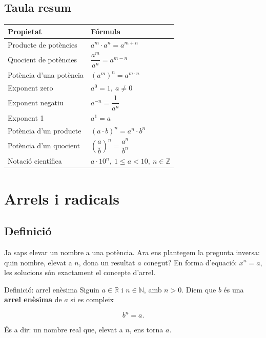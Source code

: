 \subsection{Taula resum}

\begin{center}
\begin{tabular}{ll}
\toprule
\textbf{Propietat} & \textbf{Fórmula} \\
\midrule
Producte de potències & $a^m \cdot a^n = a^{m+n}$ \\
Quocient de potències & $\dfrac{a^m}{a^n} = a^{m-n}$ \\
Potència d'una potència & $(a^m)^n = a^{m\cdot n}$ \\
Exponent zero & $a^0 = 1,\ a\neq 0$ \\
Exponent negatiu & $a^{-n} = \dfrac{1}{a^n}$ \\
Exponent 1 & $a^1 = a$ \\
Potència d'un producte & $(a\cdot b)^n = a^n\cdot b^n$ \\
Potència d'un quocient & $\left(\dfrac{a}{b}\right)^n = \dfrac{a^n}{b^n}$ \\
Notació científica & $a\cdot 10^n,\ 1\le a<10,\ n\in\mathbb{Z}$ \\
\bottomrule
\end{tabular}
\end{center}

\section{Arrels i radicals}

\subsection{Definició}

Ja saps elevar un nombre a una potència. Ara ens plantegem la pregunta inversa: quin nombre, elevat a $n$, dona un resultat $a$ conegut? En forma d'equació: $x^n=a$, les solucions són exactament el concepte d'arrel.

\begin{definicio}{Definició: arrel enèsima}
Siguin $a \in \mathbb{R}$ i $n \in \mathbb{N}$, amb $n>0$. Diem que $b$ és una \textbf{arrel enèsima} de $a$ si es compleix

\[
b^n = a.
\]

És a dir: un nombre real que, elevat a $n$, ens torna $a$.
\end{definicio}

